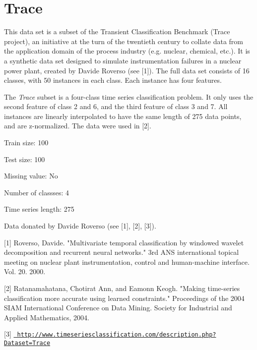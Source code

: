 \chapter{Trace}
\hypertarget{md_external_2data_2UCRArchive__2018_2Trace_2README}{}\label{md_external_2data_2UCRArchive__2018_2Trace_2README}
\label{md_external_2data_2UCRArchive__2018_2Trace_2README_autotoc_md221}%
%
 This data set is a subset of the Transient Classification Benchmark (Trace project), an initiative at the turn of the twentieth century to collate data from the application domain of the process industry (e.\+g. nuclear, chemical, etc.). It is a synthetic data set designed to simulate instrumentation failures in a nuclear power plant, created by Davide Roverso (see \mbox{[}1\mbox{]}). The full data set consists of 16 classes, with 50 instances in each class. Each instance has four features.

The {\itshape Trace} subset is a four-\/class time series classification problem. It only uses the second feature of class 2 and 6, and the third feature of class 3 and 7. All instances are linearly interpolated to have the same length of 275 data points, and are z-\/normalized. The data were used in \mbox{[}2\mbox{]}.

Train size\+: 100

Test size\+: 100

Missing value\+: No

Number of classses\+: 4

Time series length\+: 275

Data donated by Davide Roverso (see \mbox{[}1\mbox{]}, \mbox{[}2\mbox{]}, \mbox{[}3\mbox{]}).

\mbox{[}1\mbox{]} Roverso, Davide. "{}\+Multivariate temporal classification by windowed wavelet decomposition and recurrent neural networks."{} 3rd ANS international topical meeting on nuclear plant instrumentation, control and human-\/machine interface. Vol. 20. 2000.

\mbox{[}2\mbox{]} Ratanamahatana, Chotirat Ann, and Eamonn Keogh. "{}\+Making time-\/series classification more accurate using learned constraints."{} Proceedings of the 2004 SIAM International Conference on Data Mining. Society for Industrial and Applied Mathematics, 2004.

\mbox{[}3\mbox{]} \href{http://www.timeseriesclassification.com/description.php?Dataset=Trace}{\texttt{ http\+://www.\+timeseriesclassification.\+com/description.\+php?\+Dataset=\+Trace}} 